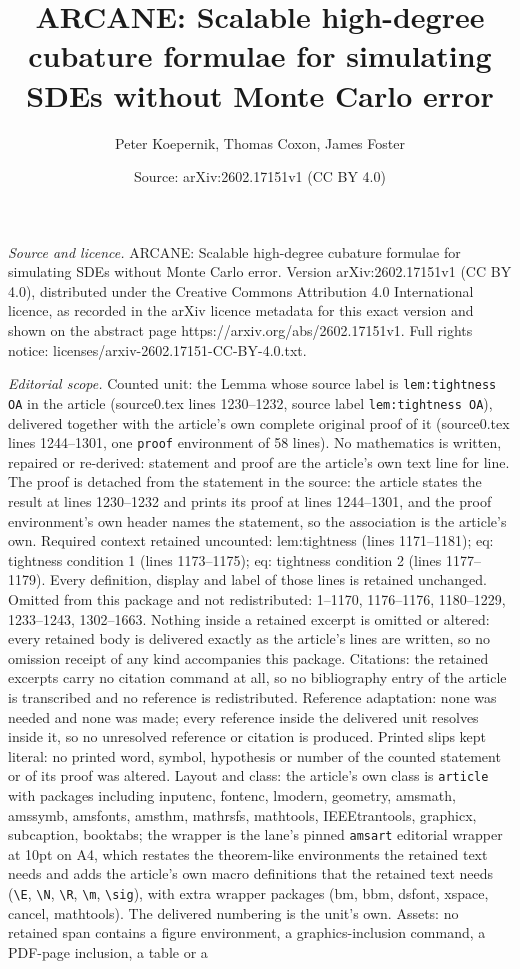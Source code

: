 \documentclass[10pt,a4paper]{amsart}
\title[ARCANE: Scalable high-degree cubature formulae for simulatin]{ARCANE: Scalable high-degree cubature formulae for simulating SDEs without Monte Carlo error}
\author{Peter Koepernik, Thomas Coxon, James Foster}
\date{Source: arXiv:2602.17151v1 (CC BY 4.0)}
\begin{document}
\maketitle

\noindent\emph{Source and licence.} ARCANE: Scalable high-degree cubature formulae for simulating SDEs without Monte Carlo error. Version arXiv:2602.17151v1 (CC BY 4.0), distributed under the Creative Commons Attribution 4.0 International licence, as recorded in the arXiv licence metadata for this exact version and shown on the abstract page https://arxiv.org/abs/2602.17151v1. Full rights notice: licenses/arxiv-2602.17151-CC-BY-4.0.txt.\par\smallskip

\noindent\textit{Editorial scope.} Counted unit: the Lemma whose source label is \texttt{lem:tightness OA} in the article (source0.tex lines 1230--1232, source label \texttt{lem:tightness OA}), delivered together with the article's own complete original proof of it (source0.tex lines 1244--1301, one \texttt{proof} environment of 58 lines). No mathematics is written, repaired or re-derived: statement and proof are the article's own text line for line. The proof is detached from the statement in the source: the article states the result at lines 1230--1232 and prints its proof at lines 1244--1301, and the proof environment's own header names the statement, so the association is the article's own. Required context retained uncounted: lem:tightness (lines 1171--1181); eq: tightness condition 1 (lines 1173--1175); eq: tightness condition 2 (lines 1177--1179). Every definition, display and label of those lines is retained unchanged. Omitted from this package and not redistributed: 1--1170, 1176--1176, 1180--1229, 1233--1243, 1302--1663. Nothing inside a retained excerpt is omitted or altered: every retained body is delivered exactly as the article's lines are written, so no omission receipt of any kind accompanies this package. Citations: the retained excerpts carry no citation command at all, so no bibliography entry of the article is transcribed and no reference is redistributed. Reference adaptation: none was needed and none was made; every reference inside the delivered unit resolves inside it, so no unresolved reference or citation is produced. Printed slips kept literal: no printed word, symbol, hypothesis or number of the counted statement or of its proof was altered. Layout and class: the article's own class is \texttt{article} with packages including inputenc, fontenc, lmodern, geometry, amsmath, amssymb, amsfonts, amsthm, mathrsfs, mathtools, IEEEtrantools, graphicx, subcaption, booktabs; the wrapper is the lane's pinned \texttt{amsart} editorial wrapper at 10pt on A4, which restates the theorem-like environments the retained text needs and adds the article's own macro definitions that the retained text needs (\texttt{\textbackslash E}, \texttt{\textbackslash N}, \texttt{\textbackslash R}, \texttt{\textbackslash m}, \texttt{\textbackslash sig}), with extra wrapper packages (bm, bbm, dsfont, xspace, cancel, mathtools). The delivered numbering is the unit's own. Assets: no retained span contains a figure environment, a graphics-inclusion command, a PDF-page inclusion, a table or a 
\end{document}

